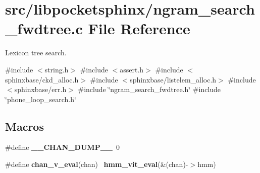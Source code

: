 \section{src/libpocketsphinx/ngram\+\_\+search\+\_\+fwdtree.c File Reference}
\label{ngram__search__fwdtree_8c}


Lexicon tree search.  


{\ttfamily \#include $<$string.\+h$>$}\newline
{\ttfamily \#include $<$assert.\+h$>$}\newline
{\ttfamily \#include $<$sphinxbase/ckd\+\_\+alloc.\+h$>$}\newline
{\ttfamily \#include $<$sphinxbase/listelem\+\_\+alloc.\+h$>$}\newline
{\ttfamily \#include $<$sphinxbase/err.\+h$>$}\newline
{\ttfamily \#include \char`\"{}ngram\+\_\+search\+\_\+fwdtree.\+h\char`\"{}}\newline
{\ttfamily \#include \char`\"{}phone\+\_\+loop\+\_\+search.\+h\char`\"{}}\newline
\subsection*{Macros}
\begin{DoxyCompactItemize}
\item 
\mbox{\label{ngram__search__fwdtree_8c_a58360b0a332f35742f89edce94c649aa}} 
\#define {\bfseries \+\_\+\+\_\+\+C\+H\+A\+N\+\_\+\+D\+U\+M\+P\+\_\+\+\_\+}~0
\item 
\mbox{\label{ngram__search__fwdtree_8c_a268c1fbc6483e1ab06c007222f08d9ad}} 
\#define {\bfseries chan\+\_\+v\+\_\+eval}(chan)~\textbf{ hmm\+\_\+vit\+\_\+eval}(\&(chan)-\/$>$hmm)
\end{DoxyCompactItemize}

